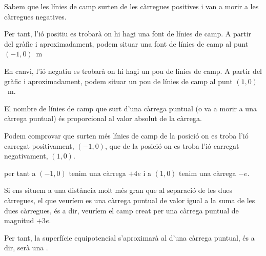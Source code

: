\begin{solapartat}
 Sabem que les línies de camp surten de les càrregues positives i van a morir a les càrregues negatives.

 Per tant, l'ió positiu es trobarà on hi hagi una font de línies de camp. A partir del gràfic i aproximadament, podem situar una font de línies de camp al punt $(-1,0)$~m

 En canvi, l'ió negatiu es trobarà on hi hagi un pou de línies de camp. A partir del gràfic i aproximadament, podem situar un pou de línies de camp al punt $(1,0)$~m.

 El nombre de línies de camp que surt d'una càrrega puntual (o va a morir a una càrrega puntual) és proporcional al valor absolut de la càrrega.

 Podem comprovar que surten més línies de camp de la posició on es troba l'ió carregat positivament, $(-1,0)$, que de la posició on es troba l'ió carregat negativament, $(1,0)$.

 per tant a $(-1,0)$ tenim una càrrega $+4e$ i a $(1,0)$ tenim una càrrega $-e$.
\end{solapartat}

\begin{solapartat}
 Si ens situem a una distància molt més gran que al separació de les dues càrregues, el que veuríem es una càrrega puntual de valor igual a la suma de les dues càrregues, és a dir, veuríem el camp creat per una càrrega puntual de magnitud $+3e$.

 Per tant, la superfície equipotencial s'aproximarà al d'una càrrega puntual, és a dir, serà una .
\end{solapartat}
